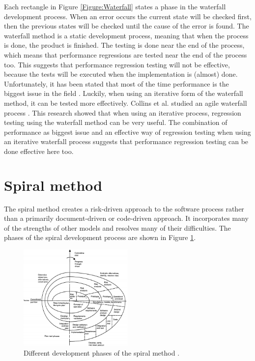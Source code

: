 Each rectangle in Figure \ref{Figure:Waterfall} states a phase in the waterfall development process. When an error occurs the current state will be checked first, then the previous states will be checked until the cause of the error is found. The waterfall method is a static development process, meaning that when the process is done, the product is finished. The testing is done near the end of the process, which means that performance regressions are tested near the end of the process too. This suggests that performance regression testing will not be effective, because the tests will be executed when the implementation is (almost) done. Unfortunately, it has been stated that most of the time performance is the biggest issue in the field \cite{foo2010mining}. Luckily, when using an iterative form of the waterfall method, it can be tested more effectively. Collins et al. studied an agile waterfall process \cite{collins2010iterative}. This research showed that when using an iterative process, regression testing using the waterfall method can be very useful. The combination of performance as biggest issue and an effective way of regression testing when using an iterative waterfall process suggests that performance regression testing can be done effective here too.

\section{Spiral method}
The spiral method creates a risk-driven approach to the software process rather than a primarily document-driven or code-driven approach. It incorporates many of the strengths
of other models and resolves many of their
difficulties\cite{boehm1988spiral}. The phases of the spiral development process are shown in Figure \ref{Figure:Spiral}. 

\begin{figure}[H]
\label{Figure:Spiral}
\begin{center}
  \includegraphics[width=0.5\textwidth]{Figures/spiral.jpg}
\end{center}
  \caption{Different development phases of the spiral method \cite{boehm1988spiral}.} 
\end{figure}

